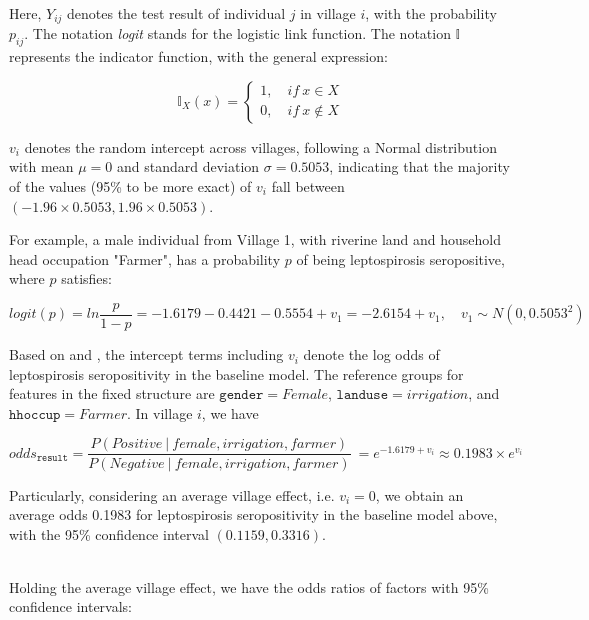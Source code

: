 \documentclass[11pt,twoside]{article}
\numberwithin{Theorem}{section}
\numberwithin{Definition}{section}
\numberwithin{Lemma}{section}
\numberwithin{Algorithm}{section}
\numberwithin{equation}{section}
\begin{document}
Here, $Y_{ij}$ denotes the test result of individual $j$ in village $i$, with the probability $p_{ij}$. The notation \emph{logit} stands for the logistic link function. The notation $\mathbb{I}$ represents the indicator function, with the general expression:

\begin{equation*}
	\mathbb{I}_X(x) = 
	\begin{cases}
		1, \quad if \ x \in X \\
		0, \quad if \ x \notin X	
	\end{cases}
\end{equation*}

$v_i$ denotes the random intercept across villages, following a Normal distribution with mean $\mu = 0$ and standard deviation $\sigma = 0.5053$, indicating that the majority of the values (95\% to be more exact) of $v_i$ fall between $(-1.96 \times 0.5053, 1.96 \times 0.5053)$.  

For example, a male individual from Village 1, with riverine land and household head occupation "Farmer", has a probability $p$ of being leptospirosis seropositive, where $p$ satisfies:

$$ logit(p) = ln \frac{p}{1-p} =  -1.6179 - 0.4421 - 0.5554 + v_1 = -2.6154 + v_1, \quad v_1 \sim N(0, 0.5053^2)$$

Based on \cite{jewell2003statistics} and \cite{zuur2009mixed}, the intercept terms including $v_i$ denote the log odds of leptospirosis seropositivity in the baseline model. The reference groups for features in the fixed structure are $\texttt{gender} = Female$, $\texttt{landuse} = irrigation$, and $\texttt{hhoccup} = Farmer$. In village $i$, we have 

$$odds_{\texttt{result}} = \frac{P(Positive \ | \ female, irrigation, farmer)}{P(Negative \ | \ female,  irrigation, farmer)} \
										= e^{-1.6179 + v_i} 
										\approx 0.1983 \times e^{v_i} $$
										
Particularly, considering an average village effect, i.e. $v_i = 0$, we obtain an average odds 0.1983 for leptospirosis seropositivity in the baseline model above, with the 95\% confidence interval $(0.1159, 0.3316)$. 

~\\
Holding the average village effect, we have the odds ratios of factors with 95\% confidence intervals:
\end{document}
